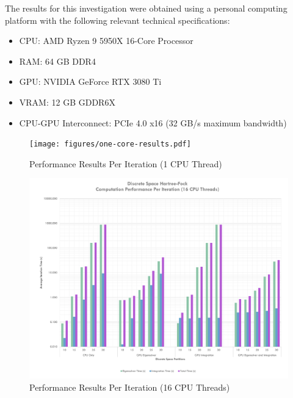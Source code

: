 \documentclass[journal, twoside]{IEEEtran}
\begin{document}
The results for this investigation were obtained using a personal computing platform with the following relevant technical specifications:

\begin{itemize}
    \item CPU: AMD Ryzen 9 5950X 16-Core Processor
    \item RAM: 64 GB DDR4
    \item GPU: NVIDIA GeForce RTX 3080 Ti
    \item VRAM: 12 GB GDDR6X
    \item CPU-GPU Interconnect: PCIe 4.0 x16 (32 GB/s maximum bandwidth)
\end{itemize}

\begin{figure}[ht]
\centering
\texttt{[image: figures/one-core-results.pdf]}
\caption{Performance Results Per Iteration (1 CPU Thread)}
\label{perf-results-per-iteration-one-core}
\end{figure}

\begin{figure}[ht]
\centering
\includegraphics[width=7in]{figures/sixteen-core-results.pdf}
\caption{Performance Results Per Iteration (16 CPU Threads)}
\label{perf-results-per-iteration-sixteen-core}
\end{figure}

\end{document}
